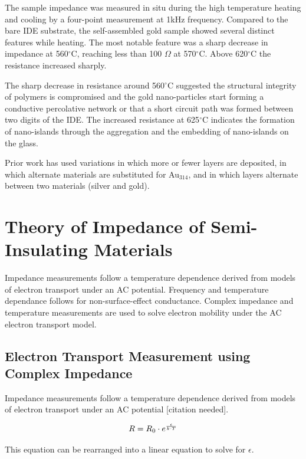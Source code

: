 The sample impedance was measured in situ during the high temperature heating and cooling by a four-point measurement at 1kHz frequency.
Compared to the bare IDE substrate, the self-assembled gold sample showed several distinct features while heating.
The most notable feature was a sharp decrease in impedance at 560$^{\circ}$C, reaching less than 100 $\Omega$ at 570$^{\circ}$C.
Above 620$^{\circ}$C the resistance increased sharply. 

The sharp decrease in resistance around 560$^{\circ}$C suggested the structural integrity of polymers is compromised and the gold nano-particles start forming a conductive percolative network or that a short circuit path was formed between two digits of the IDE.
The increased resistance at 625$^{\circ}$C indicates the formation of nano-islands through the aggregation and the embedding of nano-islands on the glass.

Prior work has used variations in which more or fewer layers are deposited, in which alternate materials are substituted for Au$_{314}$, 
    and in which layers alternate between two materials (silver and gold).

\section{Theory of Impedance of Semi-Insulating Materials}
Impedance measurements follow a temperature dependence derived from models of electron transport under an AC potential.  
Frequency and temperature dependance follows for non-surface-effect conductance.
Complex impedance and temperature measurements are used to solve electron mobility under the AC electron transport model.

    \subsection{Electron Transport Measurement using Complex Impedance}
    Impedance measurements follow a temperature dependence derived from models of electron transport under an AC potential [citation needed].  
    
    \begin{equation}
        R = R_0 \cdot e^{\epsilon\over{k \cdot T}}
        \label{eq:emobility}
    \end{equation}
    
    This equation can be rearranged into a linear equation to solve for $\epsilon$.
    
